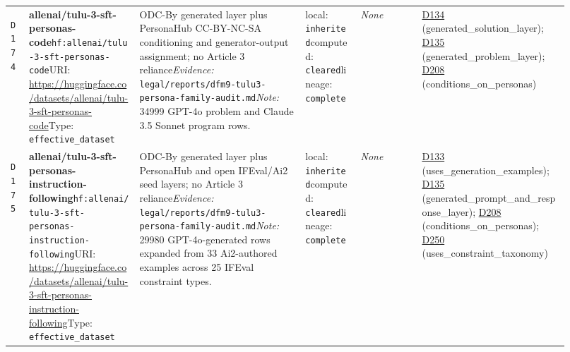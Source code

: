 \documentclass[9pt,a4paper]{article}
\newcommand{\depid}[1]{\hypertarget{dep:#1}{\texttt{#1}}}
\begin{document}
\begin{landscape}
\begin{longtable}{@{}L{0.035\linewidth}L{0.185\linewidth}L{0.27\linewidth}L{0.09\linewidth}L{0.10\linewidth}L{0.24\linewidth}@{}}
\depid{D174} & \textbf{allenai/tulu-3-sft-personas-code}\newline \nolinkurl{hf:allenai/tulu-3-sft-personas-code}\newline URI: \url{https://huggingface.co/datasets/allenai/tulu-3-sft-personas-code}\newline Type: \texttt{effective\_dataset} & ODC-By generated layer plus PersonaHub CC-BY-NC-SA conditioning and generator-output assignment; no Article 3 reliance\newline \textit{Evidence:} \nolinkurl{legal/reports/dfm9-tulu3-persona-family-audit.md}\newline \textit{Note:} 34999 GPT-4o problem and Claude 3.5 Sonnet program rows. & local: \texttt{inherited}\newline computed: \texttt{cleared}\newline lineage: \texttt{complete} & \textit{None} & \hyperlink{dep:D134}{D134} (generated\_solution\_layer); \hyperlink{dep:D135}{D135} (generated\_problem\_layer); \hyperlink{dep:D208}{D208} (conditions\_on\_personas) \\
\depid{D175} & \textbf{allenai/tulu-3-sft-personas-instruction-following}\newline \nolinkurl{hf:allenai/tulu-3-sft-personas-instruction-following}\newline URI: \url{https://huggingface.co/datasets/allenai/tulu-3-sft-personas-instruction-following}\newline Type: \texttt{effective\_dataset} & ODC-By generated layer plus PersonaHub and open IFEval/Ai2 seed layers; no Article 3 reliance\newline \textit{Evidence:} \nolinkurl{legal/reports/dfm9-tulu3-persona-family-audit.md}\newline \textit{Note:} 29980 GPT-4o-generated rows expanded from 33 Ai2-authored examples across 25 IFEval constraint types. & local: \texttt{inherited}\newline computed: \texttt{cleared}\newline lineage: \texttt{complete} & \textit{None} & \hyperlink{dep:D133}{D133} (uses\_generation\_examples); \hyperlink{dep:D135}{D135} (generated\_prompt\_and\_response\_layer); \hyperlink{dep:D208}{D208} (conditions\_on\_personas); \hyperlink{dep:D250}{D250} (uses\_constraint\_taxonomy) \\

\end{longtable}
\end{landscape}
\end{document}
